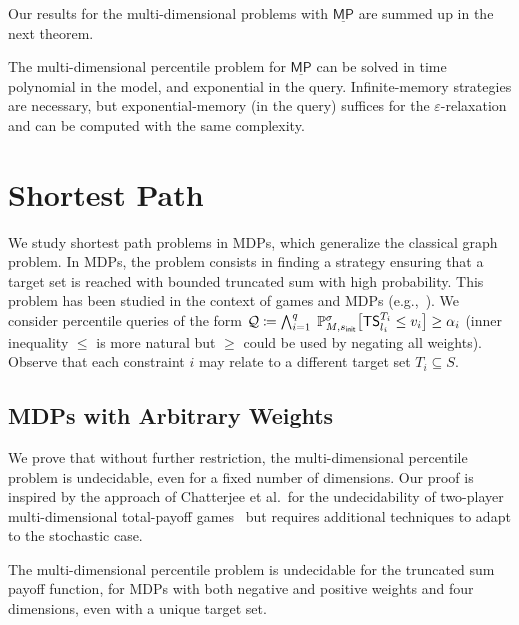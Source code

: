 \documentclass{llncs}
\newcommand{\states}{\ensuremath{S} }
\newcommand{\initState}{\ensuremath{s_{{\sf init}}} }
\newcommand{\strat}{\ensuremath{\sigma} }
\newcommand*{\pr}{\mathbb{P}}
\newcommand*{\mpinf}{\ensuremath{\underline{\mathsf{MP}}}}
\newcommand{\truncatedTarget}{\ensuremath{T} }
\newcommand{\truncatedSum}[1]{\ensuremath{{\sf TS}^{#1}} }
\newcommand{\query}{\ensuremath{\mathcal{Q}} }
\begin{document}
Our results for the multi-dimensional problems with $\mpinf$ are summed up in the next theorem.

\begin{theorem}
\label{thm:mpinf}
  The multi-dimensional percentile problem for $\mpinf$ can be solved in 
  time polynomial in the model, and exponential in the query.
  Infinite-memory strategies are necessary, but exponential-memory (in the query) suffices
  for the $\varepsilon$-relaxation and can be computed with the same complexity.
\end{theorem}

\section{Shortest Path}
\label{sec:sp}
We study shortest path problems in MDPs, which generalize the classical graph problem. In MDPs, the problem consists in finding a strategy ensuring that a target set is reached with bounded truncated sum with high probability.
This problem has been studied in the context of games and MDPs (e.g.,~\cite{bertsekas_MOR1991,DBLP:conf/concur/Alfaro99,DBLP:conf/stacs/BruyereFRR14}).
We consider percentile queries of the form $\query \coloneqq \bigwedge_{i = 1}^{q}\; \pr_{M,\initState}^\strat\big[\truncatedSum{\truncatedTarget_{i}}_{l_{i}} \leq v_i\big] \geq
\alpha_i$ (inner inequality $\leq$ is more natural but $\geq$ could be used by negating all weights). Observe that each constraint $i$ may relate to a different target set $\truncatedTarget_{i} \subseteq \states$.

\subsection{MDPs with Arbitrary Weights}

We prove that without further restriction, the multi-dimen\-sion\-al percentile problem is undecidable, even for a fixed number of dimensions. Our proof is inspired by the approach of Chatterjee et al.~for the undecidability of two-player multi-dimensional total-payoff games~\cite{DBLP:journals/iandc/Chatterjee0RR15} but requires additional techniques to adapt to the stochastic case. 

\begin{theorem}
\label{thm:truncated_undec}
The multi-dimensional percentile problem is undecidable for the truncated sum payoff function, for MDPs with both negative and positive weights and four dimensions, even with a unique target set.
\end{theorem}
\end{document}

